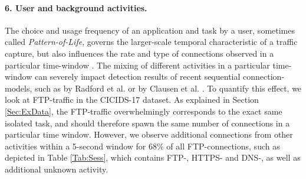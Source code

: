 






\paragraph{6. User and background activities.}
The choice and usage frequency of an application and task by a user, sometimes called \textit{Pattern-of-Life}, governs the larger-scale temporal characteristic of a traffic capture, but also influences the rate and type of connections observed in a particular time-window \cite{aparicio2017using}. The mixing of different activities in a particular time-window can severely impact detection results of recent sequential connection-models, such as by Radford et al. \cite{radford2018network} or by Clausen et al. \cite{henryLSTM}. To quantify this effect, we look at FTP-traffic in the CICIDS-17 dataset. As explained in Section \ref{Sec:ExData}, the FTP-traffic overwhelmingly corresponds to the exact same isolated task, and should therefore spawn the same number of connections in a particular time window. However, we observe additional connections from other activities within a 5-second window for $68\%$ of all FTP-connections, such as depicted in Table \ref{Tab:Sess}, which contains FTP-, HTTPS- and DNS-, as well as additional unknown activity.

